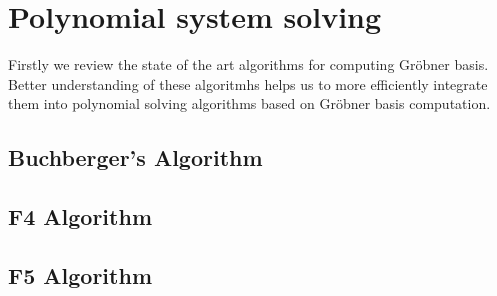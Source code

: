 \chapter{Polynomial system solving}
Firstly we review the state of the art algorithms for computing Gr\"obner basis. Better understanding of these algoritmhs helps us to more efficiently integrate them into polynomial solving algorithms based on Gr\"obner basis computation.

\section{Buchberger's Algorithm}

\section{F4 Algorithm}

\section{F5 Algorithm}

